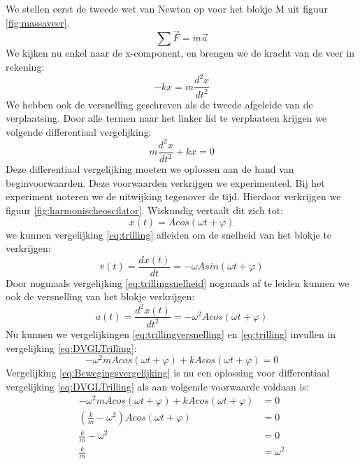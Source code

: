 \documentclass[a4paper,kul]{kulakarticle} %
\begin{document}
We stellen eerst de tweede wet van Newton op voor het blokje M uit figuur \ref{fig:massaveer}.
\begin{equation*}
	\sum \vec{F} = m\vec{a}
\end{equation*}
We kijken nu enkel naar de x-component, en brengen we de kracht van de veer in rekening:
\begin{equation*}
	-kx = m\frac{d^2x}{dt^2}
\end{equation*}
We hebben ook de versnelling geschreven als de tweede afgeleide van de verplaatsing. Door alle termen naar het linker lid te verplaatsen krijgen we volgende differentiaal vergelijking: 
\begin{equation}
	m\frac{d^2x}{dt^2} + kx = 0
	\label{eq:DVGLTrilling}
\end{equation}
Deze differentiaal vergelijking moeten we oplossen aan de hand van beginvoorwaarden. Deze voorwaarden verkrijgen we experimenteel. Bij het experiment noteren we de uitwijking tegenover de tijd. Hierdoor verkrijgen we figuur \ref{fig:harmonischeoscilator}.
Wiskundig vertaalt dit zich tot: 
\begin{equation}
	x(t) = A cos(\omega t + \varphi)
	\label{eq:trilling}
\end{equation}
we kunnen vergelijking \ref{eq:trilling} afleiden om de snelheid van het blokje te verkrijgen: 
\begin{equation}
	v(t) = \frac{dx(t)}{dt} = -\omega Asin(\omega t + \varphi)
	\label{eq:trillingsnelheid}
\end{equation}
Door nogmaals vergelijking \ref{eq:trillingsnelheid} nogmaals af te leiden kunnen we ook de versnelling van het blokje verkrijgen:
\begin{equation}
	a(t) = \frac{d^2x(t)}{dt^2} = -\omega^2 Acos(\omega t + \varphi)
	\label{eq:trillingversnelling}
\end{equation}
Nu kunnen we vergelijkingen \ref{eq:trillingversnelling} en \ref{eq:trilling} invullen in vergelijking \ref{eq:DVGLTrilling}:
\begin{equation}
	-\omega^2 mAcos(\omega t + \varphi) + k A cos(\omega t + \varphi) = 0
	\label{eq:Bewegingsvergelijking}
\end{equation}
Vergelijking \ref{eq:Bewegingsvergelijking} is nu een oplossing voor differentiaal vergelijking \ref{eq:DVGLTrilling} als aan volgende voorwaarde voldaan is:
\begin{align*}
	-\omega^2 mAcos(\omega t + \varphi) + k A cos(\omega t + \varphi) & = 0\\
	(\frac{k}{m}-\omega^2)A cos(\omega t + \varphi) & = 0\\
	\frac{k}{m}-\omega^2 & = 0\\
	\frac{k}{m} & = \omega^2
\end{align*}
\end{document}
